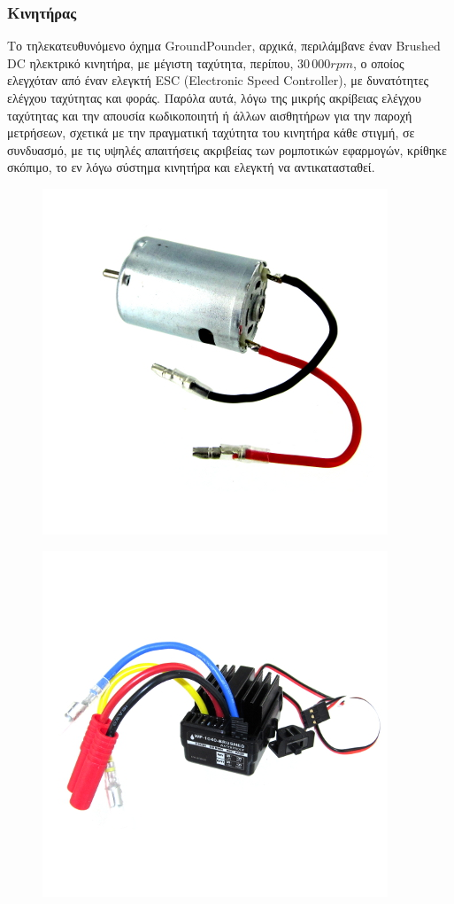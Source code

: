 \subsubsection{Κινητήρας} \label{sssec:motor}
Το τηλεκατευθυνόμενο όχημα GroundPounder, αρχικά, περιλάμβανε έναν {Brushed DC ηλεκτρικό κινητήρα}, με μέγιστη ταχύτητα, περίπου, $30\,000rpm$, ο οποίος ελεγχόταν από έναν ελεγκτή {ESC} (Electronic Speed Controller), με δυνατότητες ελέγχου ταχύτητας και φοράς. Παρόλα αυτά, λόγω της μικρής ακρίβειας ελέγχου ταχύτητας και την απουσία {κωδικοποιητή} ή άλλων αισθητήρων για την παροχή μετρήσεων, σχετικά με την πραγματική ταχύτητα του κινητήρα κάθε στιγμή, σε συνδυασμό, με τις υψηλές απαιτήσεις ακριβείας των ρομποτικών εφαρμογών, κρίθηκε σκόπιμο, το εν λόγω σύστημα κινητήρα και ελεγκτή να αντικατασταθεί.

\begin{figure}[!ht]
	\begin{minipage}{.49\textwidth}
 	\centering
		\includegraphics[width=0.6\linewidth]{Chapters/Chapter2/Figures/original_motor.jpg}
		\label{fig:original_motor}
	\end{minipage}
	\begin{minipage}{.5\textwidth}		
		\centering
		\includegraphics[width=0.6\linewidth]{Chapters/Chapter2/Figures/esc.jpg}
		\label{fig:esc}
	\end{minipage}
\end{figure}

